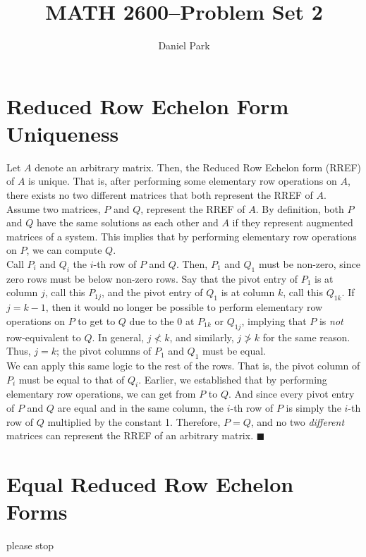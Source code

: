 \documentclass[11pt]{article}
\title{MATH 2600--Problem Set 2}
\author{Daniel Park}
\begin{document}
\maketitle

\section{Reduced Row Echelon Form Uniqueness}
Let \(A\) denote an arbitrary matrix. Then, the Reduced Row Echelon form (RREF) of \(A\) is unique. That is, after performing some elementary row operations on \(A\), there exists no two different matrices that both represent the RREF of \(A\).\\[10pt]
Assume two matrices, \(P\) and \(Q\), represent the RREF of \(A\). By definition, both \(P\) and \(Q\) have the same solutions as each other and \(A\) if they represent augmented matrices of a system. This implies that by performing elementary row operations on \(P\), we can compute \(Q\).\\[10pt]
Call \(P_i\) and \(Q_i\) the \(i\)-th row of \(P\) and \(Q\). Then, \(P_1\) and \(Q_1\) must be non-zero, since zero rows must be below non-zero rows. Say that the pivot entry of \(P_1\) is at column \(j\), call this \(P_{1j}\), and the pivot entry of \(Q_1\) is at column \(k\), call this \(Q_{1k}\). If \(j = k - 1\), then it would no longer be possible to perform elementary row operations on \(P\) to get to \(Q\) due to the 0 at \(P_{1k}\) or \(Q_{1j}\), implying that \(P\) is \textit{not} row-equivalent to \(Q\). In general, \(j \nless k\), and similarly, \(j \ngtr k\) for the same reason. Thus, \(j = k\); the pivot columns of \(P_1\) and \(Q_1\) must be equal.\\[10pt]
We can apply this same logic to the rest of the rows. That is, the pivot column of \(P_i\) must be equal to that of \(Q_i\). Earlier, we established that by performing elementary row operations, we can get from \(P\) to \(Q\). And since every pivot entry of \(P\) and \(Q\) are equal and in the same column, the \(i\)-th row of \(P\) is simply the \(i\)-th row of \(Q\) multiplied by the constant 1. Therefore, \(P = Q\), and no two \textit{different} matrices can represent the RREF of an arbitrary matrix. $\blacksquare$

\section{Equal Reduced Row Echelon Forms}
\indent please stop
\end{document}
